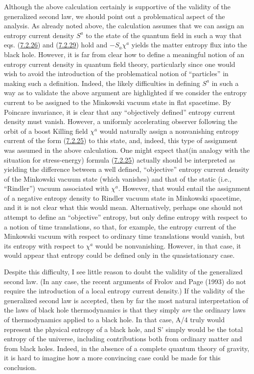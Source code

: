 \documentclass[11pt,a4paper]{article}
\begin{document}
Although the above calculation certainly is supportive of the validity of the generalized second law, we should point out a problematical aspect of the analysis. As already noted above, the calculation\hypertarget{source-187}{} assumes that we can assign an entropy current density \(S^a\) to the state of the quantum field in such a way that eqs. (\hyperref[eq:7.2.26]{7.2.26}) and (\hyperref[eq:7.2.29]{7.2.29}) hold and \(-S_a \chi^a\) yields the matter entropy flux into the black hole. However, it is far from clear how to define a meaningful notion of an entropy current density in quantum field theory, particularly since one would wish to avoid the introduction of the problematical notion of ``particles'' in making such a definition. Indeed, the likely difficulties in defining \(S^a\) in such a way as to validate the above argument are highlighted if we consider the entropy current to be assigned to the Minkowski vacuum state in flat spacetime. By Poincare invariance, it is clear that any ``objectively defined'' entropy current density must vanish. However, a uniformly accelerating observer following the orbit of a boost Killing field \(\chi^a\) would naturally assign a nonvanishing entropy current of the form (\hyperref[eq:7.2.25]{7.2.25}) to this state, and, indeed, this type of assignment was assumed in the above calculation. One might expect that(in analogy with the situation for stress-energy) formula (\hyperref[eq:7.2.25]{7.2.25}) actually should be interpreted as yielding the difference between a well defined, ``objective'' entropy current density of the Minkowski vacuum state (which vanishes) and that of the static (i.e., ``Rindler'') vacuum associated with \(\chi^a\). However, that would entail the assignment of a negative entropy density to Rindler vacuum state in Minkowski spacetime, and it is not clear what this would mean. Alternatively, perhaps one should not attempt to define an ``objective'' entropy, but only define entropy with respect to a notion of time translations, so that, for example, the entropy current of the Minkowski vacuum with respect to ordinary time translations would vanish, but its entropy with respect to \(\chi^a\) would be nonvanishing. However, in that case, it would appear that entropy could be defined only in the quasistationary case.

Despite this difficulty, I see little reason to doubt the validity of the generalized second law. (In any case, the recent arguments of Frolov and Page (1993) do not require the introduction of a local entropy current density.) If the validity of the generalized second law is accepted, then by far the most natural interpretation of the laws of black hole thermodynamics is that they simply \emph{are} the ordinary laws of thermodynamics applied to a black hole. In that case, A/4 truly would represent the physical entropy of a black hole, and S' simply would be the total entropy of the universe, including contributions both from ordinary matter and from black holes. Indeed, in \hypertarget{source-188}{} the absence of a complete quantum theory of gravity, it is hard to imagine how a more convincing case could be made for this conclusion.
\end{document}
